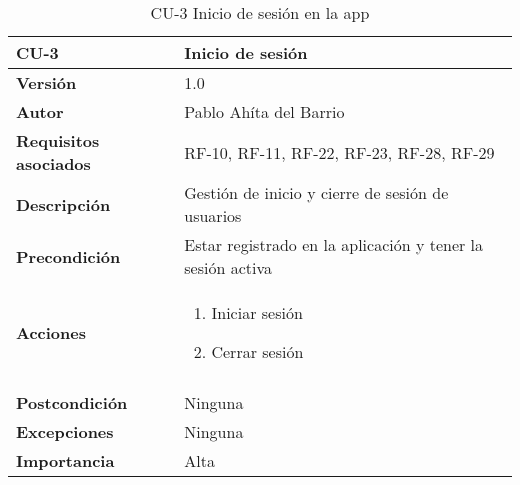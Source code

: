 \begin{table}[p]
	\centering
	\begin{tabularx}{\linewidth}{ p{} p{} }
		\toprule
		\textbf{CU-3}    & \textbf{Inicio de sesión}\\
		\toprule
		\textbf{Versión}              & 1.0    \\
		\textbf{Autor}                & Pablo Ahíta del Barrio \\
		\textbf{Requisitos asociados} & RF-10, RF-11, RF-22, RF-23, RF-28, RF-29 \\
		\textbf{Descripción}          & Gestión de inicio y cierre de sesión de usuarios\\
		\textbf{Precondición}         & Estar registrado en la aplicación y tener la sesión activa \\
		\textbf{Acciones}             &
		\begin{enumerate}
			\def\labelenumi{\arabic{enumi}.}
			\tightlist
			\item Iniciar sesión
			\item Cerrar sesión
		\end{enumerate}\\
		\\
		\textbf{Postcondición}        & Ninguna \\
		\textbf{Excepciones}          & Ninguna \\
		\textbf{Importancia}          & Alta \\
		\bottomrule
	\end{tabularx}
	\caption{CU-3 Inicio de sesión en la app}
\end{table}

